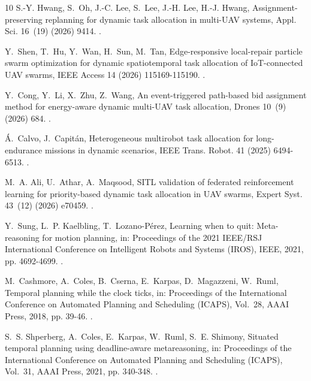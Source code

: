 \documentclass[a4paper,fleqn]{cas-dc}
\begin{document}
\begin{thebibliography}{10}
S.-Y. Hwang, S.~Oh, J.-C. Lee, S.~Lee, J.-H. Lee, H.-J. Hwang,
  Assignment-preserving replanning for dynamic task allocation in multi-{UAV}
  systems, Appl. Sci. 16~(19) (2026) 9414.
\newblock \href {https://doi.org/10.3390/app16199414}
  {}.

Y.~Shen, T.~Hu, Y.~Wan, H.~Sun, M.~Tan, Edge-responsive local-repair particle
  swarm optimization for dynamic spatiotemporal task allocation of
  {IoT}-connected {UAV} swarms, IEEE Access 14 (2026) 115169-115190.
\newblock \href {https://doi.org/10.1109/ACCESS.2026.3717031}
  {}.

Y.~Cong, Y.~Li, X.~Zhu, Z.~Wang, An event-triggered path-based bid assignment
  method for energy-aware dynamic multi-{UAV} task allocation, Drones 10~(9)
  (2026) 684.
\newblock \href {https://doi.org/10.3390/drones10090684}
  {}.

{\'A}.~Calvo, J.~Capit{\'a}n, Heterogeneous multirobot task allocation for
  long-endurance missions in dynamic scenarios, IEEE Trans. Robot. 41 (2025)
  6494-6513.
\newblock \href {https://doi.org/10.1109/TRO.2025.3626651}
  {}.

M.~A. Ali, U.~Athar, A.~Maqsood, {SITL} validation of federated reinforcement
  learning for priority-based dynamic task allocation in {UAV} swarms, Expert
  Syst. 43~(12) (2026) e70459.
\newblock \href {https://doi.org/10.1111/exsy.70459}
  {}.

Y.~Sung, L.~P. Kaelbling, T.~Lozano-P{\'e}rez, Learning when to quit:
  Meta-reasoning for motion planning, in: Proceedings of the 2021 IEEE/RSJ
  International Conference on Intelligent Robots and Systems (IROS), IEEE,
  2021, pp. 4692-4699.
\newblock \href {https://doi.org/10.1109/IROS51168.2021.9636864}
  {}.

M.~Cashmore, A.~Coles, B.~Cserna, E.~Karpas, D.~Magazzeni, W.~Ruml, Temporal
  planning while the clock ticks, in: Proceedings of the International
  Conference on Automated Planning and Scheduling (ICAPS), Vol.~28, AAAI Press,
  2018, pp. 39-46.
\newblock \href {https://doi.org/10.1609/icaps.v28i1.13878}
  {}.

S.~S. Shperberg, A.~Coles, E.~Karpas, W.~Ruml, S.~E. Shimony, Situated temporal
  planning using deadline-aware metareasoning, in: Proceedings of the
  International Conference on Automated Planning and Scheduling (ICAPS),
  Vol.~31, AAAI Press, 2021, pp. 340-348.
\newblock \href {https://doi.org/10.1609/icaps.v31i1.15979}
  {}.


\end{thebibliography}
\end{document}
